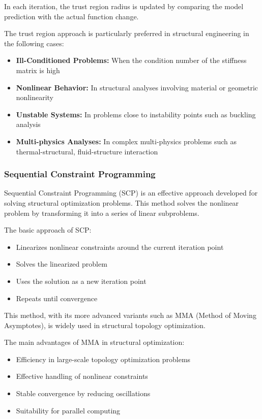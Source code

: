 In each iteration, the trust region radius is updated by comparing the model prediction with the actual function change.

\begin{tcolorbox}[title=Trust Region Applications in Structural Engineering]
The trust region approach is particularly preferred in structural engineering in the following cases:
\begin{itemize}
    \item \textbf{Ill-Conditioned Problems:} When the condition number of the stiffness matrix is high
    
    \item \textbf{Nonlinear Behavior:} In structural analyses involving material or geometric nonlinearity
    
    \item \textbf{Unstable Systems:} In problems close to instability points such as buckling analysis
    
    \item \textbf{Multi-physics Analyses:} In complex multi-physics problems such as thermal-structural, fluid-structure interaction
\end{itemize}
\end{tcolorbox}

\subsubsection{Sequential Constraint Programming}

Sequential Constraint Programming (SCP) is an effective approach developed for solving structural optimization problems. This method solves the nonlinear problem by transforming it into a series of linear subproblems.

The basic approach of SCP:
\begin{itemize}
    \item Linearizes nonlinear constraints around the current iteration point
    \item Solves the linearized problem
    \item Uses the solution as a new iteration point
    \item Repeats until convergence
\end{itemize}

This method, with its more advanced variants such as MMA (Method of Moving Asymptotes), is widely used in structural topology optimization.

The main advantages of MMA in structural optimization:
\begin{itemize}
    \item Efficiency in large-scale topology optimization problems
    \item Effective handling of nonlinear constraints
    \item Stable convergence by reducing oscillations
    \item Suitability for parallel computing
\end{itemize}

